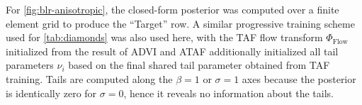 \documentclass[nohyperref]{article}
\theoremstyle{plain}
\theoremstyle{definition}
\theoremstyle{remark}
\begin{document}
For \cref{fig:blr-anisotropic}, the closed-form posterior was computed over a finite element grid to produce
the ``Target'' row. A similar progressive training scheme used for \cref{tab:diamonds} was also used here, with
the TAF flow transform $\Phi_{\text{Flow}}$ initialized from the result of ADVI and ATAF additionally initialized
all tail parameters $\nu_i$ based on the final shared tail parameter obtained from TAF training. Tails are computed
along the $\beta = 1$ or $\sigma = 1$ axes because the posterior is identically zero for $\sigma = 0$, hence it reveals
no information about the tails.


\end{document}
